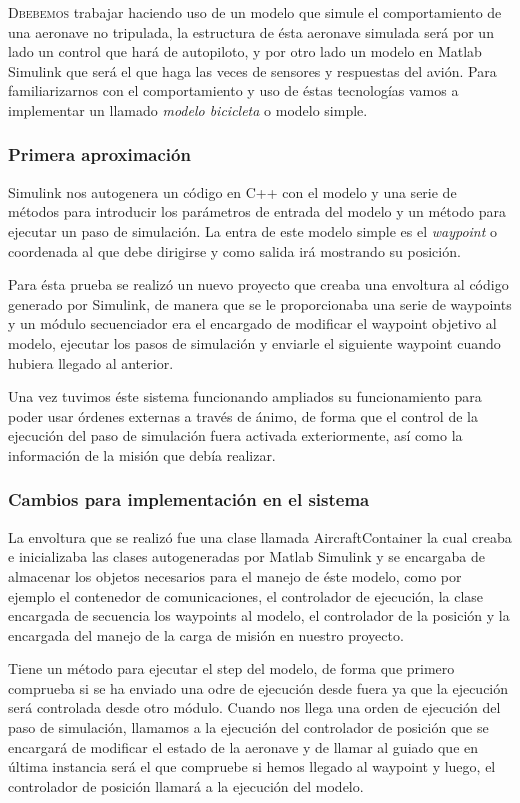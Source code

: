 \documentclass[12pt,a4paper,spanish]{book} %
\begin{document}
\lettrine{D}{bebemos} trabajar haciendo uso de un modelo que simule el comportamiento de una aeronave no tripulada, la estructura de ésta aeronave simulada será por un lado un control que hará de autopiloto, y por otro lado un modelo en Matlab Simulink que será el que haga las veces de sensores y respuestas del avión. Para familiarizarnos con el comportamiento y uso de éstas tecnologías vamos a implementar un llamado \emph{modelo bicicleta} o modelo simple.

\subsubsection{Primera aproximación}

Simulink nos autogenera un código en C++ con el modelo y una serie de métodos para introducir los parámetros de entrada del modelo y un método para ejecutar un paso de simulación. La entra de este modelo simple es el \emph{waypoint} o coordenada al que debe dirigirse y como salida irá mostrando su posición.

Para ésta prueba se realizó un nuevo proyecto que creaba una envoltura al código generado por Simulink, de manera que se le proporcionaba una serie de waypoints y un módulo secuenciador era el encargado de modificar el waypoint objetivo al modelo, ejecutar los pasos de simulación y enviarle el siguiente waypoint cuando hubiera llegado al anterior.

Una vez tuvimos éste sistema funcionando ampliados su funcionamiento para poder usar órdenes externas a través de ánimo, de forma que el control de la ejecución del paso de simulación fuera activada exteriormente, así como la información de la misión que debía realizar.

\subsubsection{Cambios para implementación en el sistema}

La envoltura que se realizó fue una clase llamada AircraftContainer la cual creaba e inicializaba las clases autogeneradas por Matlab Simulink y se encargaba de almacenar los objetos necesarios para el manejo de éste modelo, como por ejemplo el contenedor de comunicaciones, el controlador de ejecución, la clase encargada de secuencia los waypoints al modelo, el controlador de la posición y la encargada del manejo de la carga de misión en nuestro proyecto.

Tiene un método para ejecutar el step del modelo, de forma que primero comprueba si se ha enviado una odre de ejecución desde fuera ya que la ejecución será controlada desde otro módulo. Cuando nos llega una orden de ejecución del paso de simulación, llamamos a la ejecución del controlador de posición que se encargará de modificar el estado de la aeronave y de llamar al guiado que en última instancia será el que compruebe si hemos llegado al waypoint y luego, el controlador de posición llamará a la ejecución del modelo.
\end{document}
